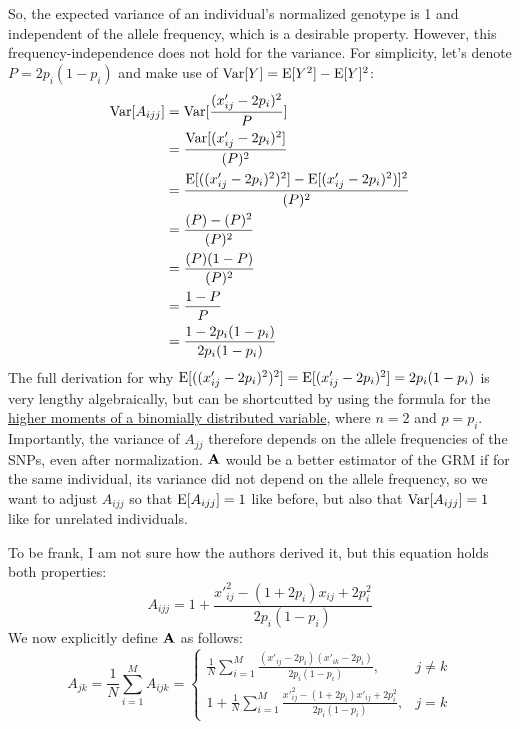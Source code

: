 \documentclass[12pt]{article}
\begin{document}
So, the expected variance of an individual's normalized genotype is 1 and independent of the allele frequency, which is a desirable property.
However, this frequency-independence does not hold for the variance.
For simplicity, let's denote $P = 2 p_i (1 - p_i)$ and make use of $\mathrm{Var}[Y] = \mathrm{E}[Y^2] - \mathrm{E}[Y]^2$:
\begin{align*}
    \mathrm{Var}[A_{ijj}] &= \mathrm{Var}[\frac{(x'_{ij} - 2 p_i)^2}{P}] \\
    &= \frac{\mathrm{Var}[(x'_{ij} - 2 p_i)^2]}{(P)^2} \\
    &= \frac{\mathrm{E}[((x'_{ij} - 2 p_i)^2)^2] - \mathrm{E}[(x'_{ij} - 2 p_i)^2)]^2}{(P)^2} \\
    &= \frac{(P) - (P)^2}{(P)^2} \\
    &= \frac{(P)(1  - P)}{(P)^2} \\
    &= \frac{1 - P}{P} \\
    &= \frac{1 - 2 p_i (1 - p_i)}{2 p_i (1 - p_i)} \\
\end{align*}
The full derivation for why $\mathrm{E}[((x'_{ij} - 2 p_i)^2)^2] = \mathrm{E}[(x'_{ij} - 2 p_i)^2] = 2 p_i (1 - p_i)$ is very lengthy algebraically, but can be shortcutted by using the formula for the \href{https://en.wikipedia.org/wiki/Binomial_distribution#Higher_moments}{higher moments of a binomially distributed variable}, where $n=2$ and $p=p_i$.
Importantly, the variance of $A_{jj}$ therefore depends on the allele frequencies of the SNPs, even after normalization.
$\mathbf{A}$ would be a better estimator of the GRM if for the same individual, its variance did not depend on the allele frequency, so we want to adjust $A_{ijj}$ so that $\mathrm{E}[A_{ijj}] = 1$ like before, but also that $\mathrm{Var}[A_{ijj}] = 1$ like for unrelated individuals.

To be frank, I am not sure how the authors derived it, but this equation holds both properties:
$$A_{ijj} = 1 + \frac{{x'}_{ij}^2 - (1 + 2 p_i) x_{ij} + 2 p_i^2}{2 p_i (1 - p_i)} $$
We now explicitly define $\mathbf{A}$ as follows:
$$
A_{jk} = \frac{1}{N}\sum_{i=1}^{M} A_{ijk} = 
\begin{cases}
\frac{1}{N}\sum_{i=1}^{M} \frac{(x'_{ij} - 2 p_i)(x'_{ik} - 2 p_i)}{ 2 p_i (1 - p_i)}, & j \neq k \\[10pt]
1 + \frac{1}{N}\sum_{i=1}^{M} \frac{{x'}_{ij}^2 - (1 + 2 p_i) x'_{ij} + 2 p_i^2}{2 p_i (1 - p_i)}, & j = k
\end{cases}
$$
\end{document}
